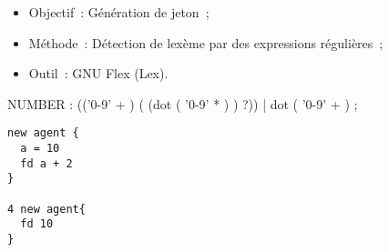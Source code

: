 \begin{frame}
	\begin{itemize}
		\item Objectif~: Génération de jeton~;
		\item Méthode~: Détection de lexème par des expressions régulières~;
		\item Outil~: GNU Flex (Lex).
	\end{itemize}
\end{frame}

\begin{frame}[fragile]
	\begin{rail}
		NUMBER : (('0-9' + ) ( (dot ( '0-9' * ) ) ?))
		| dot ( '0-9' + ) ;
	\end{rail}
\end{frame}

\begin{frame}[fragile]
	\begin{lstlisting}[language=Stibbons]
new agent {
  a = 10
  fd a + 2
}

4 new agent{
  fd 10
}
	\end{lstlisting}
\end{frame}
